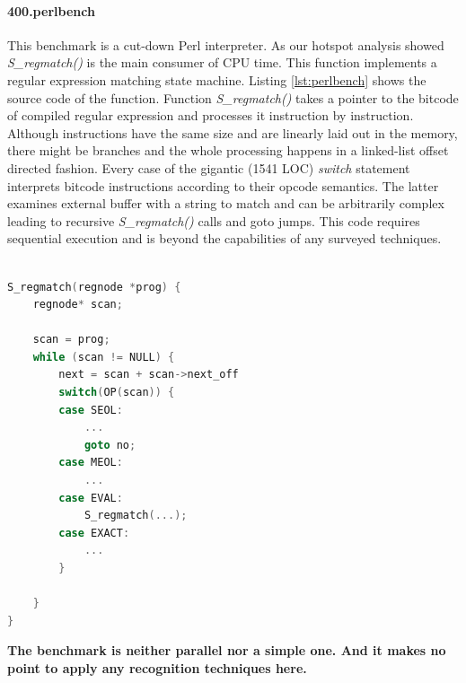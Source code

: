 \documentclass[10pt,a4paper]{report}
\begin{document}
\paragraph{400.perlbench} This benchmark is a cut-down Perl interpreter. As our hotspot analysis showed \textit{S\_regmatch()} is the main consumer of CPU time. This function implements a regular expression matching state machine. Listing \ref{lst:perlbench} shows the source code of the function. Function \textit{S\_regmatch()} takes a pointer to the bitcode of compiled regular expression and processes it instruction by instruction. Although instructions have the same size and are linearly laid out in the memory, there might be branches and the whole processing happens in a linked-list offset directed fashion. Every case of the gigantic (1541 LOC) \textit{switch} statement interprets bitcode instructions according to their opcode semantics. The latter examines external buffer with a string to match and can be arbitrarily complex leading to recursive \textit{S\_regmatch()} calls and goto jumps. This code requires sequential execution and is beyond the capabilities of any surveyed techniques.
\begin{minipage}[t]{\linewidth}
\begin{lstlisting}[caption={\textbf{regexec.c(2296)}: Regular expression matching state machine},label={lst:perlbench},language=C]

S_regmatch(regnode *prog) {
    regnode* scan;
    
    scan = prog;
    while (scan != NULL) {
        next = scan + scan->next_off
        switch(OP(scan)) {
        case SEOL:
            ...
            goto no;
        case MEOL:
            ...
        case EVAL:
            S_regmatch(...);
        case EXACT:
            ...
        }
    
    }
}
\end{lstlisting}
\end{minipage}

\quad\textbf{The benchmark is neither parallel nor a simple one. And it makes no point to apply any recognition techniques here.}
\end{document}
